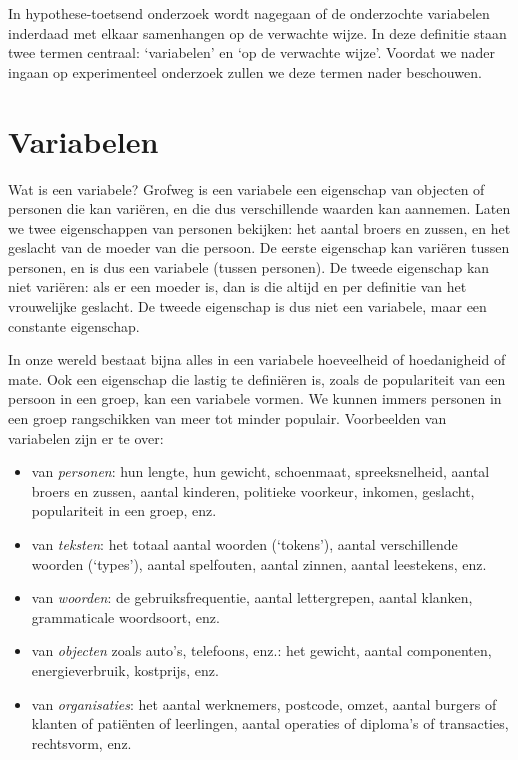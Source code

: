 \documentclass[
]{book}
\begin{document}
In hypothese-toetsend onderzoek wordt nagegaan of de onderzochte
variabelen inderdaad met elkaar samenhangen op de verwachte wijze. In
deze definitie staan twee termen centraal: `variabelen' en `op de
verwachte wijze'. Voordat we nader ingaan op experimenteel onderzoek
zullen we deze termen nader beschouwen.

\hypertarget{sec:variabelen}{%
\section{Variabelen}\label{sec:variabelen}}

Wat is een variabele? Grofweg is een variabele een eigenschap van
objecten of personen die kan variëren, en die dus verschillende waarden
kan aannemen. Laten we twee eigenschappen van personen bekijken: het
aantal broers en zussen, en het geslacht van de moeder van die persoon.
De eerste eigenschap kan variëren tussen personen, en is dus een
variabele (tussen personen). De tweede eigenschap kan niet variëren: als
er een moeder is, dan is die altijd en per definitie van het vrouwelijke
geslacht. De tweede eigenschap is dus niet een variabele, maar een
constante eigenschap.

In onze wereld bestaat bijna alles in een variabele hoeveelheid of
hoedanigheid of mate. Ook een eigenschap die lastig te definiëren is,
zoals de populariteit van een persoon in een groep, kan een variabele
vormen. We kunnen immers personen in een groep rangschikken van meer tot
minder populair. Voorbeelden van variabelen zijn er te over:

\begin{itemize}
\item
  van \emph{personen}: hun lengte, hun gewicht, schoenmaat, spreeksnelheid,
  aantal broers en zussen, aantal kinderen, politieke voorkeur,
  inkomen, geslacht, populariteit in een groep, enz.
\item
  van \emph{teksten}: het totaal aantal woorden (`tokens'), aantal
  verschillende woorden (`types'), aantal spelfouten, aantal zinnen,
  aantal leestekens, enz.
\item
  van \emph{woorden}: de gebruiksfrequentie, aantal lettergrepen, aantal
  klanken, grammaticale woordsoort, enz.
\item
  van \emph{objecten} zoals auto's, telefoons, enz.: het gewicht, aantal
  componenten, energieverbruik, kostprijs, enz.
\item
  van \emph{organisaties}: het aantal werknemers, postcode, omzet, aantal
  burgers of klanten of patiënten of leerlingen, aantal operaties of
  diploma's of transacties, rechtsvorm, enz.
\end{itemize}
\end{document}
